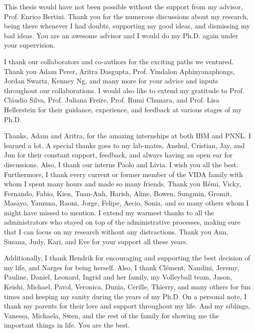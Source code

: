 This thesis would have not been possible without the support from my advisor, Prof. Enrico Bertini. Thank you for the numerous discussions about my research, being there whenever I had doubts, supporting my good ideas, and dismissing my bad ideas.
You are an awesome advisor and I would do my Ph.D. again under your supervision.

I thank our collaborators and co-authors for the exciting paths we ventured.
Thank you Adam Perer, Aritra Dasgupta, Prof. Yindalon Aphinyanaphongs, Jordan Swartz, Kenney Ng, and many more for your advice and inputs throughout our collaborations.
I would also like to extend my gratitude to Prof. Cl\'audio Silva, Prof. Juliana Freire, Prof. Rumi Chunara, and Prof. Lisa Hellerstein for their guidance, experience, and feedback at various stages of my Ph.D.

Thanks, Adam and Aritra, for the amazing internships at both IBM and PNNL. I learned a lot.
A special thanks goes to my lab-mates, Anshul, Cristian, Jay, and Jun for their constant support, feedback, and always having an open ear for discussions.
Also, I thank our interns Paolo and Livia. I wish you all the best.
Furthermore, I thank every current or former member of the VIDA family with whom I spent many hours and made so many friends. Thank you R\'emi, Vicky, Fernando, Fabio, Kien, Tuan-Anh, Harish, Aline, Bowen, Sungmin, Gromit, Masayo, Yamuna, Raoni, Jorge, Felipe, Aecio, Sonia, and so many others whom I might have missed to mention.
I extend my warmest thanks to all the administrators who stayed on top of the administrative processes, making sure that I can focus on my research without any distractions. Thank you Ann, Susana, Judy, Kari, and Eve for your support all these years.

Additionally, I thank Hendrik for encouraging and supporting the best decision of my life, and Narges for being herself.
Also, I thank Cl\'ement, Nandini, Jeremy, Pauline, Daniel, Leonard, Ingrid and her family, my Volleyball team, Jason, Keishi, Michael, Pavol, Veronica, Dunia, Cerille, Thierry, and many others for fun times and keeping my sanity during the years of my Ph.D.
On a personal note, I thank my parents for their love and support throughout my life.
And my siblings, Vanessa, Michaela, Swen, and the rest of the family for showing me the important things in life.
You are the best.

\noindent
{}
\makebox[\textwidth]{\hfill\makebox[3in]{\hfill\graddate\hfill}}
